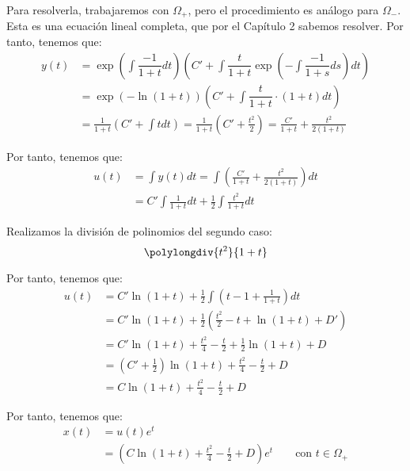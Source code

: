 \begin{ejercicio}
\begin{enumerate}
        Para resolverla, trabajaremos con $\Omega_+$, pero el procedimiento es análogo para $\Omega_-$.
        Esta es una ecuación lineal completa, que por el Capítulo 2 sabemos resolver. Por tanto, tenemos que:
        \begin{align*}
            y(t)&=\exp\left(\int \dfrac{-1}{1+t}dt\right)\left(C'+\int \dfrac{t}{1+t}\exp\left(-\int \dfrac{-1}{1+s}ds\right)dt\right)\\
            &= \exp(-\ln(1+t))\left(C'+\int \dfrac{t}{1+t}\cdot (1+t)dt\right)\\
            &= \frac{1}{1+t}\left(C'+\int tdt\right)
            = \frac{1}{1+t}\left(C'+\frac{t^2}{2}\right)
            = \frac{C'}{1+t}+\frac{t^2}{2(1+t)}
        \end{align*}

        Por tanto, tenemos que:
        \begin{align*}
            u(t)&=\int y(t)dt=\int \left(\frac{C'}{1+t}+\frac{t^2}{2(1+t)}\right)dt\\
            &= C'\int \frac{1}{1+t}dt + \frac{1}{2}\int \frac{t^2}{1+t}dt
        \end{align*}

        Realizamos la división de polinomios del segundo caso:
        $$\polylongdiv{t^2}{1+t}$$

        Por tanto, tenemos que:
        \begin{align*}
            u(t)&=C'\ln(1+t)+\frac{1}{2}\int \left(t-1+\frac{1}{1+t}\right)dt\\
            &= C'\ln(1+t)+\frac{1}{2}\left(\frac{t^2}{2}-t+\ln(1+t)+D'\right)\\
            &= C'\ln(1+t)+\frac{t^2}{4}-\frac{t}{2}+\frac{1}{2}\ln(1+t)+D\\
            &= \left(C'+\frac{1}{2}\right)\ln(1+t)+\frac{t^2}{4}-\frac{t}{2}+D\\
            &= C\ln(1+t)+\frac{t^2}{4}-\frac{t}{2}+D
        \end{align*}

        Por tanto, tenemos que:
        \begin{align*}
            x(t)&=u(t)e^t\\
            &= \left(C\ln(1+t)+\frac{t^2}{4}-\frac{t}{2}+D\right)e^t
            \qquad \text{con } t\in \Omega_+
        \end{align*}

    \end{enumerate}
\end{ejercicio}

